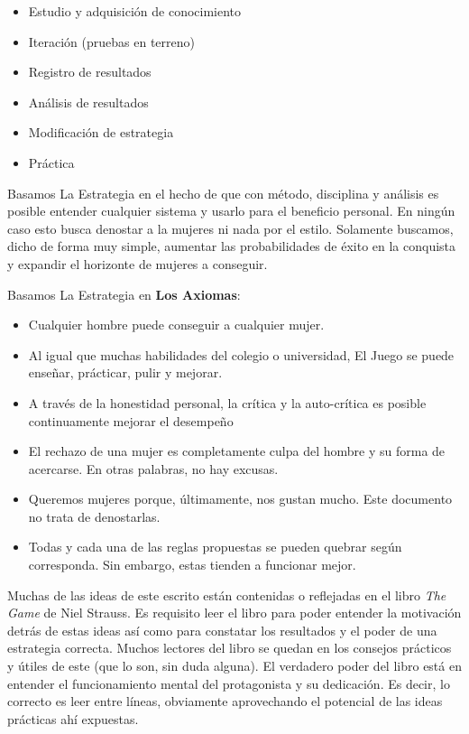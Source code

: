 \documentclass{article}
\begin{document}
\begin{itemize}
\item Estudio y adquisición de conocimiento
\item Iteración (pruebas en terreno)
\item Registro de resultados
\item Análisis de resultados
\item Modificación de estrategia
\item Práctica
\end{itemize}

Basamos La Estrategia en el hecho de que con método, disciplina y análisis es posible entender cualquier sistema y usarlo para el beneficio personal. En ningún caso esto busca denostar a la mujeres ni nada por el estilo. Solamente buscamos, dicho de forma muy simple, aumentar las probabilidades de éxito en la conquista y expandir el horizonte de mujeres a conseguir.

Basamos La Estrategia en \textbf{Los Axiomas}:
\begin{itemize}
\item Cualquier hombre puede conseguir a cualquier mujer.
\item Al igual que muchas habilidades del colegio o universidad, El Juego se puede enseñar, prácticar, pulir y mejorar.
\item A través de la honestidad personal, la crítica y la auto-crítica es posible continuamente mejorar el desempeño 
\item El rechazo de una mujer es completamente culpa del hombre y su forma de acercarse. En otras palabras, no hay excusas.
\item Queremos mujeres porque, últimamente, nos gustan mucho. Este documento no trata de denostarlas.

\item Todas y cada una de las reglas propuestas se pueden quebrar según corresponda. Sin embargo, estas tienden a funcionar mejor.

\end{itemize}

Muchas de las ideas de este escrito están contenidas o reflejadas en el libro \textit{The Game} de Niel Strauss. Es requisito leer el libro para poder entender la motivación detrás de estas ideas así como para constatar los resultados y el poder de una estrategia correcta. Muchos lectores del libro se quedan en los consejos prácticos y útiles de este (que lo son, sin duda alguna). El verdadero poder del libro está en entender el funcionamiento mental del protagonista y su dedicación. Es decir, lo correcto es leer entre líneas, obviamente aprovechando el potencial de las ideas prácticas ahí expuestas.
\end{document}
